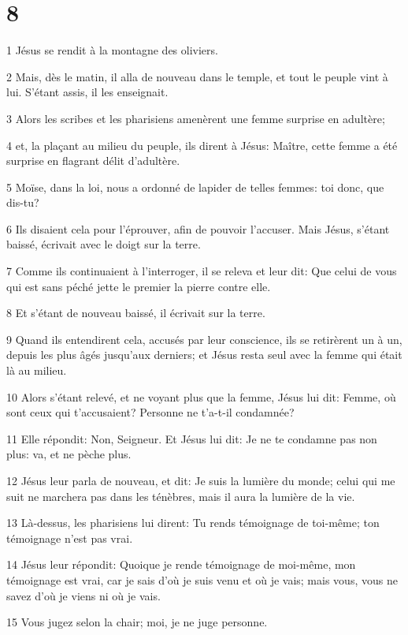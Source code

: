 \chapter{8}

\par 1 Jésus se rendit à la montagne des oliviers.
\par 2 Mais, dès le matin, il alla de nouveau dans le temple, et tout le peuple vint à lui. S'étant assis, il les enseignait.
\par 3 Alors les scribes et les pharisiens amenèrent une femme surprise en adultère;
\par 4 et, la plaçant au milieu du peuple, ils dirent à Jésus: Maître, cette femme a été surprise en flagrant délit d'adultère.
\par 5 Moïse, dans la loi, nous a ordonné de lapider de telles femmes: toi donc, que dis-tu?
\par 6 Ils disaient cela pour l'éprouver, afin de pouvoir l'accuser. Mais Jésus, s'étant baissé, écrivait avec le doigt sur la terre.
\par 7 Comme ils continuaient à l'interroger, il se releva et leur dit: Que celui de vous qui est sans péché jette le premier la pierre contre elle.
\par 8 Et s'étant de nouveau baissé, il écrivait sur la terre.
\par 9 Quand ils entendirent cela, accusés par leur conscience, ils se retirèrent un à un, depuis les plus âgés jusqu'aux derniers; et Jésus resta seul avec la femme qui était là au milieu.
\par 10 Alors s'étant relevé, et ne voyant plus que la femme, Jésus lui dit: Femme, où sont ceux qui t'accusaient? Personne ne t'a-t-il condamnée?
\par 11 Elle répondit: Non, Seigneur. Et Jésus lui dit: Je ne te condamne pas non plus: va, et ne pèche plus.
\par 12 Jésus leur parla de nouveau, et dit: Je suis la lumière du monde; celui qui me suit ne marchera pas dans les ténèbres, mais il aura la lumière de la vie.
\par 13 Là-dessus, les pharisiens lui dirent: Tu rends témoignage de toi-même; ton témoignage n'est pas vrai.
\par 14 Jésus leur répondit: Quoique je rende témoignage de moi-même, mon témoignage est vrai, car je sais d'où je suis venu et où je vais; mais vous, vous ne savez d'où je viens ni où je vais.
\par 15 Vous jugez selon la chair; moi, je ne juge personne.
